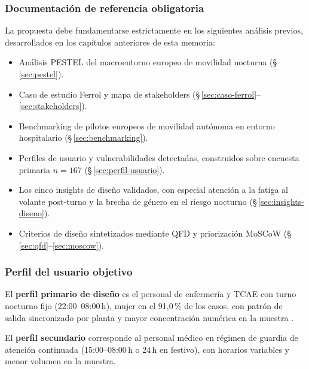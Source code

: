 
\subsubsection{Documentación de referencia obligatoria}
\label{sec:pliego-documentacion}

La propuesta debe fundamentarse estrictamente en los siguientes
análisis previos, desarrollados en los capítulos anteriores de
esta memoria:

\begin{itemize}
  \item Análisis \acs{PESTEL} del macroentorno europeo de movilidad
        nocturna (§\,\ref{sec:pestel}).
  \item Caso de estudio Ferrol y mapa de stakeholders
        (§\,\ref{sec:caso-ferrol}--\ref{sec:stakeholders}).
  \item Benchmarking de pilotos europeos de movilidad autónoma en
        entorno hospitalario (§\,\ref{sec:benchmarking}).
  \item Perfiles de usuario y vulnerabilidades detectadas, construidos
        sobre encuesta primaria $n = 167$
        (§\,\ref{sec:perfil-usuario}).
  \item Los cinco insights de diseño validados, con especial atención
        a la fatiga al volante post-turno y la brecha de género en el
        riesgo nocturno (§\,\ref{sec:insights-diseno}).
  \item Criterios de diseño sintetizados mediante \acs{QFD} y
        priorización \acs{MoSCoW} (§\,\ref{sec:qfd}--\ref{sec:moscow}).
\end{itemize}


\subsubsection{Perfil del usuario objetivo}
\label{sec:pliego-usuario}

El \textbf{perfil primario de diseño} es el personal de enfermería y
\acs{TCAE} con turno nocturno fijo (22:00--08:00\,h), mujer en el
91{,}0\,\% de los casos, con patrón de salida sincronizado por planta
y mayor concentración numérica en la muestra
\parencite{LouridoRegueira2026}.

El \textbf{perfil secundario} corresponde al personal médico en régimen
de guardia de atención continuada (15:00--08:00\,h o 24\,h en festivo),
con horarios variables y menor volumen en la muestra.

